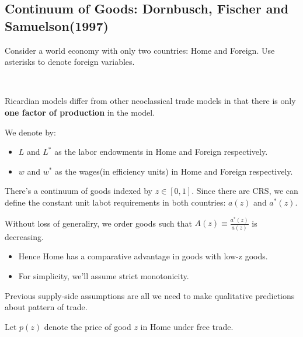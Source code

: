 \subsection{Continuum of Goods: Dornbusch, Fischer and Samuelson(1997)}

Consider a world economy with only two countries: Home and Foreign.
Use asterisks to denote foreign variables. 
\begin{note}
    \

    Ricardian models diﬀer from other neoclassical trade models in that
    there is only \textbf{one factor of production} in the model.
\end{note}

We denote by:
\begin{itemize}
    \item $L$ and $L^*$ as the labor endowments in Home and Foreign respectively.
    \item $w$ and $w^*$ as the wages(in efficiency units) in Home and Foreign respectively.
\end{itemize}

There's a continuum of goods indexed by $z \in [0,1]$.
Since there are CRS, we can define the constant unit labot requirements in both countries: $a(z)$ and $a^*(z)$.

Without loss of generaliry, we order goods such that $A(z) \equiv \frac{a^*(z)}{a(z)}$ is decreasing.
\begin{itemize}
    \item Hence Home has a comparative advantage in goods with low-z goods.
    \item For simplicity, we'll assume strict monotonicity.
\end{itemize}

Previous supply-side assumptions are all we need to make qualitative
predictions about pattern of trade.

Let $p(z)$ denote the price of good $z$ in Home under free trade.


